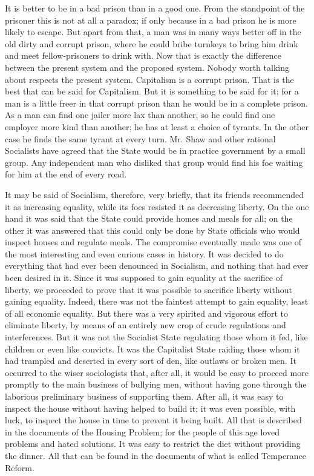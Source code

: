 \documentclass{book}
\begin{document}
It is better to be in a bad prison than in a good one. From the standpoint of the prisoner this is not at all a paradox; if only because in a bad prison he is more likely to escape. But apart from that, a man was in many ways better off in the old dirty and corrupt prison, where he could bribe turnkeys to bring him drink and meet fellow-prisoners to drink with. Now that is exactly the difference between the present system and the proposed system. Nobody worth talking about respects the present system. Capitalism is a corrupt prison. That is the best that can be said for Capitalism. But it is something to be said for it; for a man is a little freer in that corrupt prison than he would be in a complete prison. As a man can find one jailer more lax than another, so he could find one employer more kind than another; he has at least a choice of tyrants. In the other case he finds the same tyrant at every turn. Mr. Shaw and other rational Socialists have agreed that the State would be in practice government by a small group. Any independent man who disliked that group would find his foe waiting for him at the end of every road.

It may be said of Socialism, therefore, very briefly, that its friends recommended it as increasing equality, while its foes resisted it as decreasing liberty. On the one hand it was said that the State could provide homes and meals for all; on the other it was answered that this could only be done by State officials who would inspect houses and regulate meals. The compromise eventually made was one of the most interesting and even curious cases in history. It was decided to do everything that had ever been denounced in Socialism, and nothing that had ever been desired in it. Since it was supposed to gain equality at the sacrifice of liberty, we proceeded to prove that it was possible to sacrifice liberty without gaining equality. Indeed, there was not the faintest attempt to gain equality, least of all economic equality. But there was a very spirited and vigorous effort to eliminate liberty, by means of an entirely new crop of crude regulations and interferences. But it was not the Socialist State regulating those whom it fed, like children or even like convicts. It was the Capitalist State raiding those whom it had trampled and deserted in every sort of den, like outlaws or broken men. It occurred to the wiser sociologists that, after all, it would be easy to proceed more promptly to the main business of bullying men, without having gone through the laborious preliminary business of supporting them. After all, it was easy to inspect the house without having helped to build it; it was even possible, with luck, to inspect the house in time to prevent it being built. All that is described in the documents of the Housing Problem; for the people of this age loved problems and hated solutions. It was easy to restrict the diet without providing the dinner. All that can be found in the documents of what is called Temperance Reform.
\end{document}
